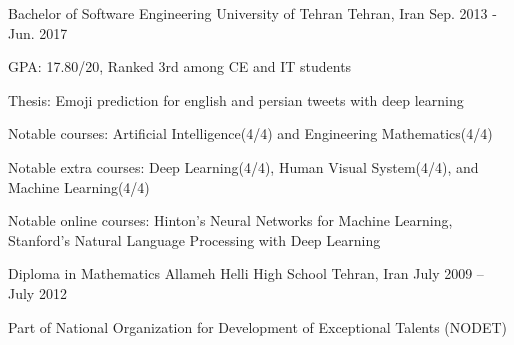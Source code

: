 

\begin{cventries}
  
  \cventry
    {Bachelor of Software Engineering} %
    {University of Tehran} %
    {Tehran, Iran} %
    {Sep. 2013 - Jun. 2017} %
    {
      \begin{cvitems} %
        \item {GPA: 17.80/20, Ranked 3rd among CE and IT students}
        \item {Thesis: Emoji prediction for english and persian tweets with deep learning}
        \item {Notable courses: Artificial Intelligence(4/4) and Engineering Mathematics(4/4)}
        \item {Notable extra courses: Deep Learning(4/4), Human Visual System(4/4), and Machine Learning(4/4)}
        \item {Notable online courses: Hinton's Neural Networks for Machine Learning, Stanford's Natural Language Processing with Deep Learning}
      \end{cvitems}
    }
    
  \cventry
  	{Diploma in Mathematics}
  	{Allameh Helli High School}
  	{Tehran, Iran}
  	{July 2009 – July 2012}
  	{
      \begin{cvitems} %
        \item {Part of National Organization for Development of Exceptional Talents (NODET)}
      \end{cvitems}
    }

\end{cventries}
